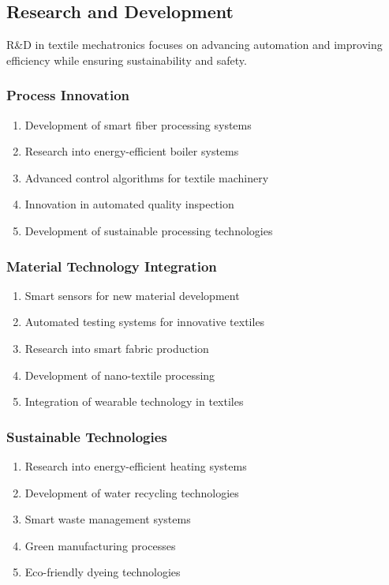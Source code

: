 \subsection{Research and Development}
R\&D in textile mechatronics focuses on advancing automation and improving efficiency while ensuring sustainability and safety.
\subsubsection{Process Innovation}
\begin{enumerate}
\item Development of smart fiber processing systems
\item Research into energy-efficient boiler systems
\item Advanced control algorithms for textile machinery
\item Innovation in automated quality inspection
\item Development of sustainable processing technologies
\end{enumerate}
\subsubsection{Material Technology Integration}
\begin{enumerate}
\item Smart sensors for new material development
\item Automated testing systems for innovative textiles
\item Research into smart fabric production
\item Development of nano-textile processing
\item Integration of wearable technology in textiles
\end{enumerate}
\subsubsection{Sustainable Technologies}
\begin{enumerate}
\item Research into energy-efficient heating systems
\item Development of water recycling technologies
\item Smart waste management systems
\item Green manufacturing processes
\item Eco-friendly dyeing technologies
\end{enumerate}
